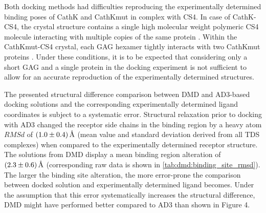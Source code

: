 Both docking methods had difficulties reproducing the experimentally determined
binding poses of CathK and CathKmut in complex with CS4. In case of CathK-CS4,
the crystal structure contains a single high molecular weight polymeric CS4
molecule interacting with multiple copies of the same protein
\cite{catK_cs4_crystal_structure_2008}. Within the CathKmut-CS4 crystal, each
GAG hexamer tightly interacts with two CathKmut proteins
\cite{catKmut_cs4_crystal_2011}. Under these conditions, it is to be expected
that considering only a short GAG and a single protein in the docking experiment
is not sufficient to allow for an accurate reproduction of the experimentally
determined structures.

The presented structural difference comparison between DMD and AD3-based docking
solutions and the corresponding experimentally determined ligand coordinates is
subject to a systematic error. Structural relaxation prior to docking with AD3
changed the receptor side chains in the binding region by a heavy atom $RMSd$ of
$(1.0\pm0.4)\,\textup{\AA}$ (mean value and standard deviation derived from all TDS
complexes) when compared to the experimentally determined receptor structure.
The solutions from DMD display a mean binding region alteration of
$(2.3\pm0.6)\,\textup{\AA}$ (corresponding raw data is shown in
\cref{tab:dmd:binding_site_rmsd}). The larger the binding site
alteration, the more error-prone the comparison between docked solution and
experimentally determined ligand becomes. Under the assumption that this error
systematically increases the structural difference, DMD might have performed
better compared to AD3 than shown in Figure 4.


